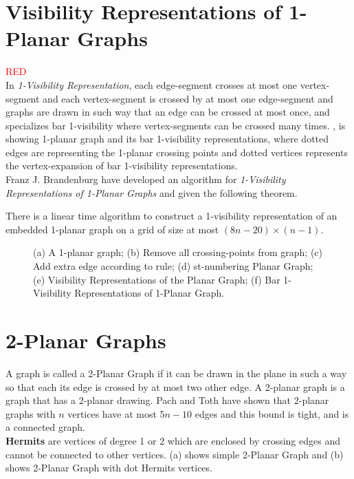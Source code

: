 \section{Visibility Representations of 1-Planar Graphs}
\label{sec:1vr}

\textcolor{red}{RED}\\
In \emph{1-Visibility Representation}, each edge-segment crosses at most one vertex-segment and each vertex-segment is crossed by at most one edge-segment and graphs are drawn in such way that an edge can be crossed at most once\cite{FJ}, and specializes bar 1-visibility where vertex-segments can be crossed many times. , is showing 1-planar graph and its bar 1-visibility representations, where dotted edges are representing the 1-planar crossing points and dotted vertices represents the vertex-expansion of bar 1-visibility representations. 
\\
Franz J. Brandenburg \cite{FJ} have developed an algorithm for \emph{1-Visibility Representations of 1-Planar Graphs} and given the following theorem.

\begin{theorem} 

There is a linear time algorithm to construct a 1-visibility representation of an embedded 1-planar graph on a grid of size at most $(8n-20) \times (n-1)$.

\end{theorem}





\begin{figure}[!tb]
\centering
\resizebox{150mm}{!}{}
\caption{(a) A 1-planar graph; (b) Remove all crossing-points from graph; (c) Add extra edge according to rule; (d) st-numbering Planar Graph; (e) Visibility Representations of the Planar Graph; (f) Bar 1-Visibility Representations of 1-Planar Graph.}
\label{fig:1vvv}
\end{figure}












\section{2-Planar Graphs}
\label{sec:2pg}

A graph is called a 2-Planar Graph if it can be drawn in the plane in such a way so that each its edge is crossed by at most two other edge. A 2-planar graph is a graph that has a 2-planar drawing.
Pach and Toth\cite{PachNToth} have shown that 2-planar graphs with $n$ vertices have at most $5n-10$ edges and this bound is tight, and is a connected graph.
\\
\textbf{Hermits} are vertices of degree 1 or 2 which are enclosed by crossing edges and cannot be connected to other vertices.  (a) shows simple 2-Planar Graph and (b) shows 2-Planar Graph with dot Hermits vertices.


